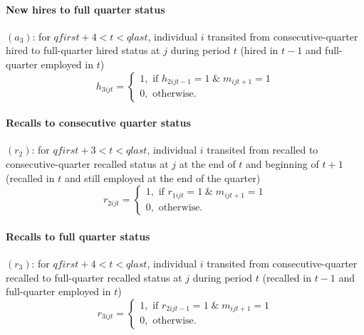 \paragraph{New hires to full quarter status}


$\left( a_{3}\right) $: for $qfirst+4<t<qlast$, individual $i$ transited
from consecutive-quarter hired to full-quarter hired status at $j$ during
period $t$ (hired in $t-1$ and full-quarter employed in $t$)%
\begin{equation}
h_{3ijt}=\left\{ 
\begin{array}{l}
1,\text{ if }h_{2ijt-1}=1\;\&\;m_{ijt+1}=1 \\ 
0,\text{ otherwise.}%
\end{array}%
\right.  \label{eq:h3ijt}
\end{equation}

\paragraph{Recalls to consecutive quarter status}


$\left( r_{2}\right) $: for $qfirst+3<t<qlast$, individual $i$ transited
from recalled to consecutive-quarter recalled status at $j$ at the end of $t$
and beginning of $t+1$ (recalled in $t$ and still employed at the end of the
quarter)%
\begin{equation}
r_{2ijt}=\left\{ 
\begin{array}{l}
1,\text{ if }r_{1ijt}=1\;\&\;m_{ijt+1}=1 \\ 
0,\text{ otherwise.}%
\end{array}%
\right.  \label{eq:r2ijt}
\end{equation}

\paragraph{Recalls to full quarter status}


$\left( r_{3}\right) $: for $qfirst+4<t<qlast$, individual $i$ transited
from consecutive-quarter recalled to full-quarter recalled status at $j$
during period $t$ (recalled in $t-1$ and full-quarter employed in $t$)%
\begin{equation}
r_{3ijt}=\left\{ 
\begin{array}{l}
1,\text{ if }r_{2ijt-1}=1\;\&\;m_{ijt+1}=1 \\ 
0,\text{ otherwise.}%
\end{array}%
\right.  \label{eq:r3ijt}
\end{equation}


